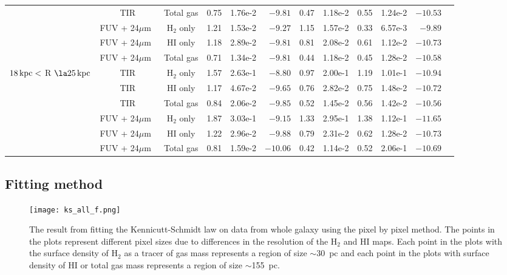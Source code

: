 \documentclass[useAMS,usenatbib]{mn2e}
\newcommand \kpc        {\,{\rm kpc}}
\newcommand \um    {$\mu$m\ }
\begin{document}
\begin{table*}
\begin{tabular}{cccccrccccrr}
 & TIR         & Total gas  & 0.75 & 1.76e-2  & $-9.81$  & 0.47 & 1.18e-2  & 0.55 & 1.24e-2  & $-10.53$ \\
 & FUV + 24\um & H$_2$ only & 1.21 & 1.53e-2 & $-9.27$  & 1.15 & 1.57e-2 & 0.33 & 6.57e-3 & $-9.89$  \\
 & FUV + 24\um & HI only    & 1.18 & 2.89e-2 & $-9.81$  & 0.81 & 2.08e-2 & 0.61 & 1.12e-2 & $-10.73$ \\
 & FUV + 24\um & Total gas  & 0.71 & 1.34e-2 & $-9.81$  & 0.44 & 1.18e-2  & 0.45 & 1.28e-2  & $-10.58$ \\
\hline
\multicolumn{1}{c}{\multirow{6}{*}{$18\kpc <$ R $\la 25\kpc$}}  & TIR & H$_2$ only & 1.57 & 2.63e-1  & $-8.80$  & 0.97 & 2.00e-1  & 1.19 & 1.01e-1  & $-10.94$ \\
 & TIR         & HI only    & 1.17 & 4.67e-2 & $-9.65$  & 0.76 & 2.82e-2 & 0.75 & 1.48e-2 & $-10.72$ \\
 & TIR         & Total gas  & 0.84 & 2.06e-2  & $-9.85$  & 0.52 & 1.45e-2  & 0.56 & 1.42e-2  & $-10.56$ \\
 & FUV + 24\um & H$_2$ only & 1.87 & 3.03e-1  & $-9.15$  & 1.33 & 2.95e-1  & 1.38 & 1.12e-1  & $-11.65$ \\
 & FUV + 24\um & HI only    & 1.22 & 2.96e-2 & $-9.88$  & 0.79 & 2.31e-2 & 0.62 & 1.28e-2 & $-10.73$ \\
 & FUV + 24\um & Total gas  & 0.81 & 1.59e-2 & $-10.06$ & 0.42 & 1.14e-2  & 0.52 & 2.06e-1  & $-10.69$\\
 \hline
\end{tabular}
\end{table*}

\subsection{Fitting method}
\label{sec:fitting}

\begin{figure*}
\centering
\texttt{[image: ks\_all\_f.png]}
\caption{The result from fitting the Kennicutt-Schmidt law on data from whole galaxy using the pixel by pixel method. The points in the plots represent 
different pixel sizes due to differences in the resolution of the H$_2$ and HI maps. Each point in the plots with the surface density of H$_2$ as a tracer of gas mass represents a region of size $\sim$30~pc and each point in the plots with surface density of HI or total gas mass represents a region of size $\sim$155~pc.
} 
\label{fig:ks,all}
\end{figure*}
\end{document}

